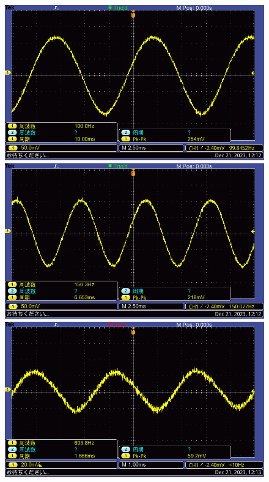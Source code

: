 \documentclass{ltjsarticle}
\begin{document}
			\begin{figure}[H]
			\centering
			\begin{minipage}{0.4\columnwidth}
			\centering
			\includegraphics[width = \columnwidth]{figs/F0011TEK.PNG}
			\end{minipage}
			\hspace{0.04\columnwidth}
			\begin{minipage}{0.4\columnwidth}
			\centering
			\includegraphics[width = \columnwidth]{figs/F0012TEK.PNG}
			\end{minipage}
			\hspace{0.04\columnwidth}
			\begin{minipage}{0.4\columnwidth}
			\centering
			\includegraphics[width = \columnwidth]{figs/F0013TEK.PNG}

\end{minipage}
\end{figure}
\end{document}
